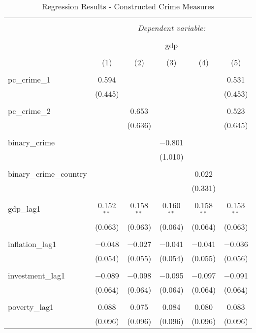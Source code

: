 
\begin{table}[!htbp] \centering 
  \caption{Regression Results - Constructed Crime Measures} 
  \label{} 
\begin{tabular}{@{\extracolsep{5pt}}lccccc} 
\\[-1.8ex]\hline 
\hline \\[-1.8ex] 
 & \multicolumn{5}{c}{\textit{Dependent variable:}} \\ 
\cline{2-6} 
\\[-1.8ex] & \multicolumn{5}{c}{gdp} \\ 
\\[-1.8ex] & (1) & (2) & (3) & (4) & (5)\\ 
\hline \\[-1.8ex] 
 pc\_crime\_1 & 0.594 &  &  &  & 0.531 \\ 
  & (0.445) &  &  &  & (0.453) \\ 
  & & & & & \\ 
 pc\_crime\_2 &  & 0.653 &  &  & 0.523 \\ 
  &  & (0.636) &  &  & (0.645) \\ 
  & & & & & \\ 
 binary\_crime &  &  & $-$0.801 &  &  \\ 
  &  &  & (1.010) &  &  \\ 
  & & & & & \\ 
 binary\_crime\_country &  &  &  & 0.022 &  \\ 
  &  &  &  & (0.331) &  \\ 
  & & & & & \\ 
 gdp\_lag1 & 0.152$^{**}$ & 0.158$^{**}$ & 0.160$^{**}$ & 0.158$^{**}$ & 0.153$^{**}$ \\ 
  & (0.063) & (0.063) & (0.064) & (0.064) & (0.063) \\ 
  & & & & & \\ 
 inflation\_lag1 & $-$0.048 & $-$0.027 & $-$0.041 & $-$0.041 & $-$0.036 \\ 
  & (0.054) & (0.055) & (0.054) & (0.055) & (0.056) \\ 
  & & & & & \\ 
 investment\_lag1 & $-$0.089 & $-$0.098 & $-$0.095 & $-$0.097 & $-$0.091 \\ 
  & (0.064) & (0.064) & (0.064) & (0.064) & (0.064) \\ 
  & & & & & \\ 
 poverty\_lag1 & 0.088 & 0.075 & 0.084 & 0.080 & 0.083 \\ 
  & (0.096) & (0.096) & (0.096) & (0.096) & (0.096) \\ 

\end{tabular}
\end{table}
